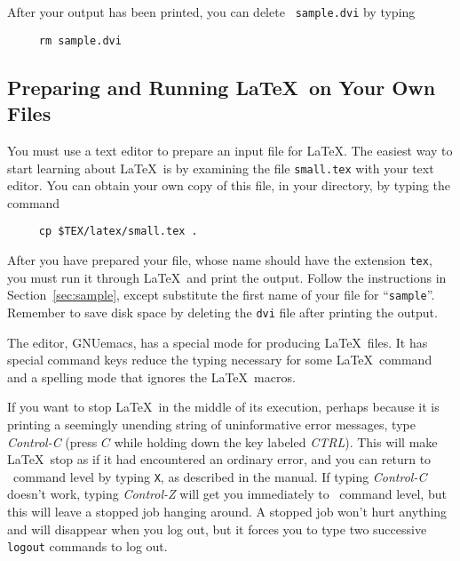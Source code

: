 After your output has been printed, you can delete \mbox{\tt
sample.dvi} by typing
\begin{verbatim}
     rm sample.dvi
\end{verbatim}

\subsection{Preparing and Running \LaTeX\ on Your Own Files}

You must use a text editor to prepare an input file for \LaTeX. 
The easiest way to start learning about \LaTeX\ is by 
examining the file \mbox{\tt small.tex} with your text editor.
You can obtain your own copy of this file, in your directory,
by typing the command
\begin{verbatim}
     cp $TEX/latex/small.tex .
\end{verbatim}

After you have prepared your file, whose name should have the extension
{\tt tex}, you must run it through \LaTeX\ and print the output.
Follow the instructions in Section~\ref{sec:sample}, except substitute
the first name of your file for ``\mbox{\tt sample}''.  Remember to
save disk space by deleting the {\tt dvi} file after printing the
output.

The editor, GNUemacs, has a special mode for producing \LaTeX\ files.
It has special command keys reduce the typing necessary for some
\LaTeX\ command and a spelling mode that ignores the \LaTeX\ macros.


If you want to stop \LaTeX\ in the middle of its execution, perhaps
because it is printing a seemingly unending string of uninformative
error messages, type {\em Control-C\/} (press $C$ while holding down
the key labeled {\em CTRL\/}).  This will make \LaTeX\ stop as if it
had encountered an ordinary error, and you can return to \UNIX\ command
level by typing {\tt X}, as described in the manual.  If typing {\em
Control-C\/} doesn't work, typing {\em Control-Z\/} will get you
immediately to \UNIX\ command level, but this will leave a stopped job
hanging around.  A stopped job won't hurt anything and will disappear
when you log out, but it forces you to type two successive \mbox{\tt
logout} commands to log out.

